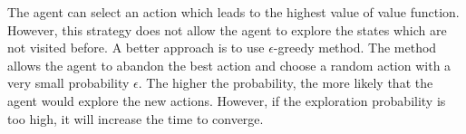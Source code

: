 






The agent can select an action which leads to the highest value of value function. However, 
this strategy does not allow the agent to explore the states which are not visited before.
A better approach is to use $\epsilon$-greedy method. The method allows the agent to abandon the
best action and choose
a random action with a very small probability $\epsilon$. The higher the probability, the more
likely that the agent would explore the new actions. However, if the exploration probability 
is too high, it will increase the time to converge.

